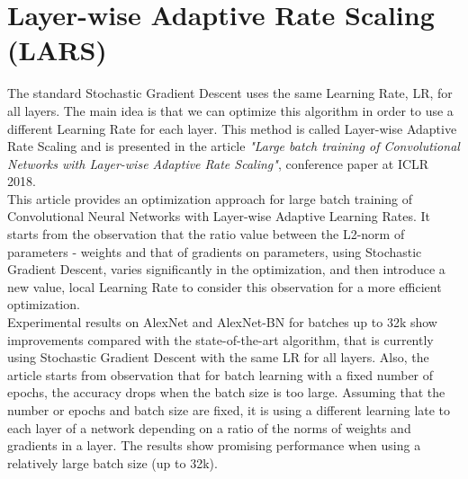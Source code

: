 \documentclass[12pt]{article}
\begin{document}
\section*{Layer-wise Adaptive Rate Scaling (LARS)} 
\hspace*{10mm}The standard Stochastic Gradient Descent uses the same Learning Rate, LR, for all layers. The main idea is that we can optimize this algorithm in order to use a different Learning Rate for each layer. This method is called Layer-wise Adaptive Rate Scaling and is presented in the article \textit{"Large batch training of Convolutional Networks with Layer-wise Adaptive Rate Scaling"}, conference paper at ICLR 2018.
\\\hspace*{10mm}This article provides an optimization approach for large batch training of Convolutional Neural Networks with Layer-wise Adaptive Learning Rates. It starts from the observation that the ratio value between the L2-norm of parameters - weights and that of gradients on parameters, using Stochastic Gradient Descent, varies significantly in the optimization,  and then introduce a new value, local Learning Rate to consider this observation for a more efficient optimization. 
\\\hspace*{10mm}Experimental results on AlexNet and AlexNet-BN for batches up to 32k show improvements compared with the state-of-the-art algorithm, that is currently using Stochastic Gradient Descent with the same LR for all layers. Also, the article starts from observation that for batch learning with a fixed number of epochs, the accuracy drops when the batch size is too large. Assuming that the number or epochs and batch size are fixed, it is using a different learning late to each layer of a network depending on a ratio of the norms of weights and gradients in a layer. The results show promising performance when using a relatively large batch size (up to 32k).

\end{document}
